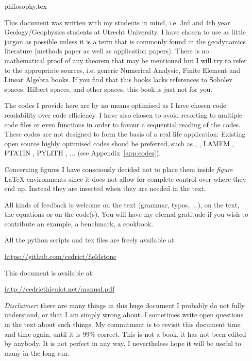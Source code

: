 \begin{flushright} {\tiny {\color{gray} philosophy.tex}} \end{flushright}

This document was written with my students in mind, i.e. 3rd and 4th year 
Geology/Geophysics students at Utrecht University. 
I have chosen to use as little jargon as possible unless it is a term that is 
commonly found in the geodynamics literature (methods paper as well as 
application papers). There is no mathematical proof of any theorem that may 
be mentioned but I will try to refer to the appropriate sources, i.e.
generic Numerical Analysic, Finite Element and 
Linear Algebra books. If you find that this books lacks references
to Sobolev spaces, Hilbert spaces, and other spaces, this book is just not for you.  

The codes I provide here are by no means optimised as I have chosen code readability 
over code efficiency. I have also chosen to avoid resorting to multiple code 
files or even functions in order to favour a sequential reading of the codes. 
These codes are not designed to form the basis of a real life application:
Existing open source highly optimised codes shoud be preferred, such as 
\aspect{} \cite{krhb12,hedg17}, \citcoms \cite{zhzm00,zhmt08}, LAMEM \cite{kapb16}, 
PTATIN \cite{mabl14,mabl15}, PYLITH \cite{aakw13}, ... (see Appendix~\ref{app:codes}).

Concerning figures I have consciously decided not to place them inside {\sl figure} \LaTeX 
environments since it does not allow for complete control over where they end up. 
Instead they are inserted when they are needed in the text. 

All kinds of feedback is welcome on the text (grammar, typos, ...), on the text, the equations
or on the code(s). You will have my eternal gratitude if you wish to contribute an 
example, a benchmark, a cookbook. 

All the python scripts and tex files are freely available at 
\begin{center}
\url{https://github.com/cedrict/fieldstone}
\end{center}
This document is available at:
\begin{center}
\url{http://cedricthieulot.net/manual.pdf}  
\end{center}

{\sl Disclaimer}: there are many things in this huge document I probably do not fully understand, 
or that I am simply wrong about. I sometimes write open questions in the text about such 
things. My commitment is to revisit this document time and time again, until it is 99\% correct.
This is not a book, it has not been edited by anybody. It is not perfect in any way. 
I nevertheless hope it will be useful to many in the long run. 


